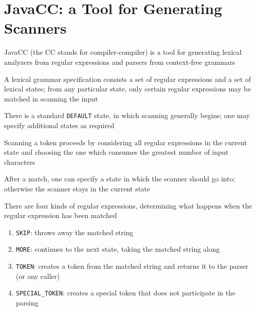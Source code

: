 \documentclass[8pt,a4paper,compress]{beamer}
\begin{document}
\section{JavaCC: a Tool for Generating Scanners}
\begin{frame}[fragile]
\pause

JavaCC (the CC stands for compiler-compiler) is a tool for generating lexical analyzers from regular expressions and parsers from context-free grammars

\pause
\bigskip

A lexical grammar specification consists a set of regular expressions and a set of lexical states; from any particular state, only certain regular expressions may be matched in scanning the input

\pause
\bigskip

There is a standard \lstinline{DEFAULT} state, in which scanning generally begins; one may specify additional states as required

\pause
\bigskip

Scanning a token proceeds by considering all regular expressions in the current state and choosing the one which consumes the greatest number of input characters

\pause
\bigskip

After a match, one can specify a state in which the scanner should go into; otherwise the scanner stays in the current state

\pause
\bigskip

There are four kinds of regular expressions, determining what happens when the regular expression has been matched
\begin{enumerate}
\item \lstinline{SKIP}: throws away the matched string
\item \lstinline{MORE}: continues to the next state, taking the matched string along
\item \lstinline{TOKEN}: creates a token from the matched string and returns it to the parser (or any caller)
\item \lstinline{SPECIAL_TOKEN}: creates a special token that does not participate in the parsing
\end{enumerate}
\end{frame}
\end{document}
